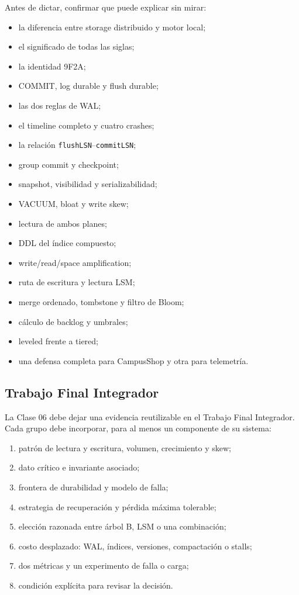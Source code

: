 \documentclass[variant=docente,cover=institutional,mode=screen]{ua-engineering-v6-article}
\begin{document}
Antes de dictar, confirmar que puede explicar sin mirar:

\begin{itemize}
\item la diferencia entre storage distribuido y motor local;
\item el significado de todas las siglas;
\item la identidad 9F2A;
\item COMMIT, log durable y flush durable;
\item las dos reglas de WAL;
\item el timeline completo y cuatro crashes;
\item la relación \texttt{flushLSN}--\texttt{commitLSN};
\item group commit y checkpoint;
\item snapshot, visibilidad y serializabilidad;
\item VACUUM, bloat y write skew;
\item lectura de ambos planes;
\item DDL del índice compuesto;
\item write/read/space amplification;
\item ruta de escritura y lectura LSM;
\item merge ordenado, tombstone y filtro de Bloom;
\item cálculo de backlog y umbrales;
\item leveled frente a tiered;
\item una defensa completa para CampusShop y otra para telemetría.
\end{itemize}

\subsection{Trabajo Final Integrador}

La Clase 06 debe dejar una evidencia reutilizable en el Trabajo Final Integrador. Cada grupo debe incorporar, para al menos un componente de su sistema:

\begin{enumerate}
\item patrón de lectura y escritura, volumen, crecimiento y skew;
\item dato crítico e invariante asociado;
\item frontera de durabilidad y modelo de falla;
\item estrategia de recuperación y pérdida máxima tolerable;
\item elección razonada entre árbol B, LSM o una combinación;
\item costo desplazado: WAL, índices, versiones, compactación o stalls;
\item dos métricas y un experimento de falla o carga;
\item condición explícita para revisar la decisión.
\end{enumerate}
\end{document}
